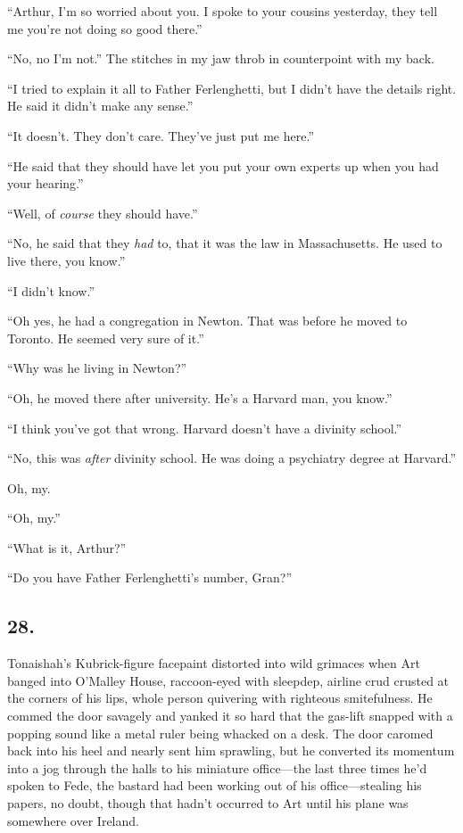 “Arthur, I’m so worried about you. I spoke to your cousins
yesterday, they tell me you’re not doing so good there.”

“No, no I’m not.” The stitches in my jaw throb in counterpoint with
my back.

“I tried to explain it all to Father Ferlenghetti, but I didn’t
have the details right. He said it didn’t make any sense.”

“It doesn’t. They don’t care. They’ve just put me here.”

“He said that they should have let you put your own experts up when
you had your hearing.”

“Well, of \emph{course} they should have.”

“No, he said that they \emph{had} to, that it was the law in
Massachusetts. He used to live there, you know.”

“I didn’t know.”

“Oh yes, he had a congregation in Newton. That was before he moved
to Toronto. He seemed very sure of it.”

“Why was he living in Newton?”

“Oh, he moved there after university. He’s a Harvard man, you
know.”

“I think you’ve got that wrong. Harvard doesn’t have a divinity
school.”

“No, this was \emph{after} divinity school. He was doing a
psychiatry degree at Harvard.”

Oh, my.

“Oh, my.”

“What is it, Arthur?”

“Do you have Father Ferlenghetti’s number, Gran?”

\subsection{28.}

Tonaishah’s Kubrick-figure facepaint distorted into wild grimaces
when Art banged into O’Malley House, raccoon-eyed with sleepdep,
airline crud crusted at the corners of his lips, whole person
quivering with righteous smitefulness. He commed the door savagely
and yanked it so hard that the gas-lift snapped with a popping
sound like a metal ruler being whacked on a desk. The door caromed
back into his heel and nearly sent him sprawling, but he converted
its momentum into a jog through the halls to his miniature
office—the last three times he’d spoken to Fede, the bastard had
been working out of his office—stealing his papers, no doubt,
though that hadn’t occurred to Art until his plane was somewhere
over Ireland.

